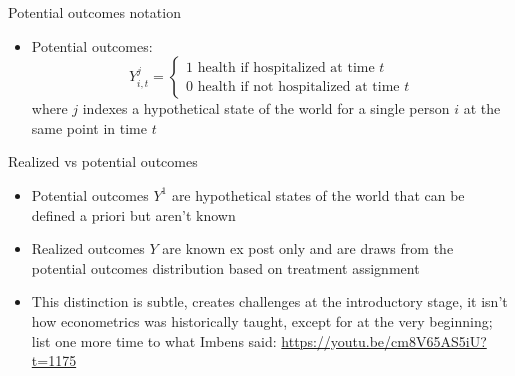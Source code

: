 \documentclass{beamer}
\begin{document}
\begin{frame}{Potential outcomes notation}

  \begin{itemize}
    \item Potential outcomes: $$Y_{i,t}^j =\begin{cases} 1 \text{ health if hospitalized at time $t$} \\ 0 \text{ health if not hospitalized at time $t$} \end{cases}$$where $j$ indexes a hypothetical state of the world for a single person $i$ at the same point in time $t$
  \end{itemize}
\end{frame}


\begin{frame}{Realized vs potential outcomes}

  \begin{itemize}
    \item Potential outcomes $Y^1$ are hypothetical states of the world that can be defined a priori but aren't known
    \item Realized outcomes $Y$ are known ex post only and are draws from the potential outcomes distribution based on treatment assignment
    \item This distinction is subtle, creates challenges at the introductory stage, it isn't how econometrics was historically taught, except for at the very beginning; list one more time to what Imbens said: \url{https://youtu.be/cm8V65AS5iU?t=1175}
  \end{itemize}
\end{frame}
\end{document}
